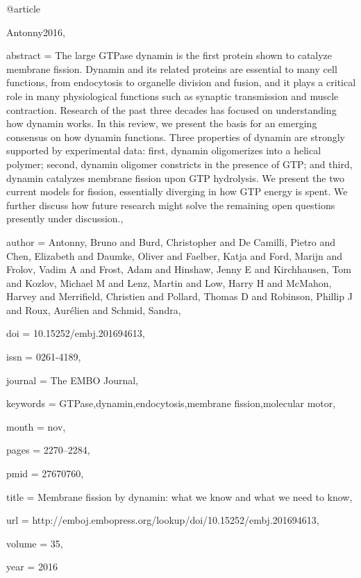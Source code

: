 @article{Antonny2016,

abstract = {The large GTPase dynamin is the first protein shown to catalyze membrane fission. Dynamin and its related proteins are essential to many cell functions, from endocytosis to organelle division and fusion, and it plays a critical role in many physiological functions such as synaptic transmission and muscle contraction. Research of the past three decades has focused on understanding how dynamin works. In this review, we present the basis for an emerging consensus on how dynamin functions. Three properties of dynamin are strongly supported by experimental data: first, dynamin oligomerizes into a helical polymer; second, dynamin oligomer constricts in the presence of GTP; and third, dynamin catalyzes membrane fission upon GTP hydrolysis. We present the two current models for fission, essentially diverging in how GTP energy is spent. We further discuss how future research might solve the remaining open questions presently under discussion.},

author = {Antonny, Bruno and Burd, Christopher and {De Camilli}, Pietro and Chen, Elizabeth and Daumke, Oliver and Faelber, Katja and Ford, Marijn and Frolov, Vadim A and Frost, Adam and Hinshaw, Jenny E and Kirchhausen, Tom and Kozlov, Michael M and Lenz, Martin and Low, Harry H and McMahon, Harvey and Merrifield, Christien and Pollard, Thomas D and Robinson, Phillip J and Roux, Aur{\'{e}}lien and Schmid, Sandra},

doi = {10.15252/embj.201694613},

issn = {0261-4189},

journal = {The EMBO Journal},

keywords = {GTPase,dynamin,endocytosis,membrane fission,molecular motor},

month = {nov},

pages = {2270--2284},

pmid = {27670760},

title = {{Membrane fission by dynamin: what we know and what we need to know}},

url = {http://emboj.embopress.org/lookup/doi/10.15252/embj.201694613},

volume = {35},

year = {2016}

}

